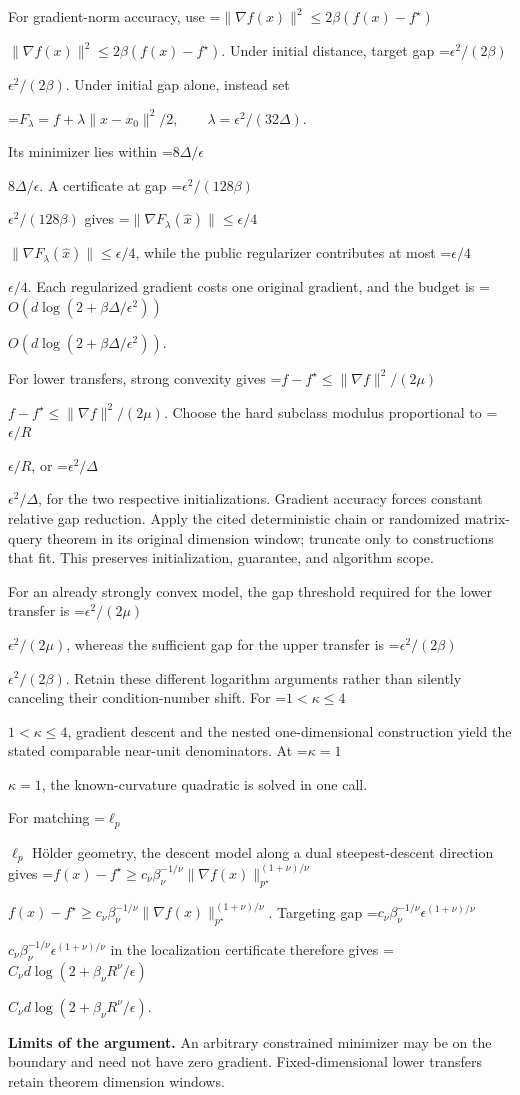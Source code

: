 \documentclass[10pt,a4paper]{article}
\newcommand{\AtlasMath}[1]{\par\begingroup\centering\setbox0=\hbox{$\displaystyle #1$}\ifdim\wd0>1.4\linewidth\typeout{ATLAS WIDE FORMULA: \the\wd0}\fi\ifdim\wd0>\linewidth\resizebox{\linewidth}{!}{\box0}\else\box0\fi\par\endgroup}
\newcommand{\AtlasInlineMath}[1]{\begingroup\setbox0=\hbox{$#1$}\ifdim\wd0>.4\linewidth\endgroup\AtlasMath{#1}\else\endgroup$#1$\fi}
\begin{document}
For gradient-norm accuracy, use \AtlasInlineMath{\|\nabla f(x)\|^2\le2\beta(f(x)-f^\star)}. Under initial distance, target gap \AtlasInlineMath{\epsilon^2/(2\beta)}. Under initial gap alone, instead set

\AtlasMath{F_\lambda=f+\lambda\|x-x_0\|^2/2,\qquad\lambda=\epsilon^2/(32\Delta).}

Its minimizer lies within \AtlasInlineMath{8\Delta/\epsilon}. A certificate at gap \AtlasInlineMath{\epsilon^2/(128\beta)} gives \AtlasInlineMath{\|\nabla F_\lambda(\widehat x)\|\le\epsilon/4}, while the public regularizer contributes at most \AtlasInlineMath{\epsilon/4}. Each regularized gradient costs one original gradient, and the budget is \AtlasInlineMath{O(d\log(2+\beta\Delta/\epsilon^2))}.

For lower transfers, strong convexity gives \AtlasInlineMath{f-f^\star\le\|\nabla f\|^2/(2\mu)}. Choose the hard subclass modulus proportional to \AtlasInlineMath{\epsilon/R}, or \AtlasInlineMath{\epsilon^2/\Delta}, for the two respective initializations. Gradient accuracy forces constant relative gap reduction. Apply the cited deterministic chain or randomized matrix-query theorem in its original dimension window; truncate only to constructions that fit. This preserves initialization, guarantee, and algorithm scope.

For an already strongly convex model, the gap threshold required for the lower transfer is \AtlasInlineMath{\epsilon^2/(2\mu)}, whereas the sufficient gap for the upper transfer is \AtlasInlineMath{\epsilon^2/(2\beta)}. Retain these different logarithm arguments rather than silently canceling their condition-number shift. For \AtlasInlineMath{1<\kappa\le4}, gradient descent and the nested one-dimensional construction yield the stated comparable near-unit denominators. At \AtlasInlineMath{\kappa=1}, the known-curvature quadratic is solved in one call.

For matching \AtlasInlineMath{\ell_p} Hölder geometry, the descent model along a dual steepest-descent direction gives
\AtlasInlineMath{f(x)-f^\star\ge c_\nu\beta_\nu^{-1/\nu}\|\nabla f(x)\|_{p^\star}^{(1+\nu)/\nu}}.
Targeting gap \AtlasInlineMath{c_\nu\beta_\nu^{-1/\nu}\epsilon^{(1+\nu)/\nu}} in the localization certificate therefore gives
\AtlasInlineMath{C_\nu d\log(2+\beta_\nu R^\nu/\epsilon)}.

\textbf{Limits of the argument.} An arbitrary constrained minimizer may be on the boundary and need not have zero gradient. Fixed-dimensional lower transfers retain theorem dimension windows.
\end{document}
